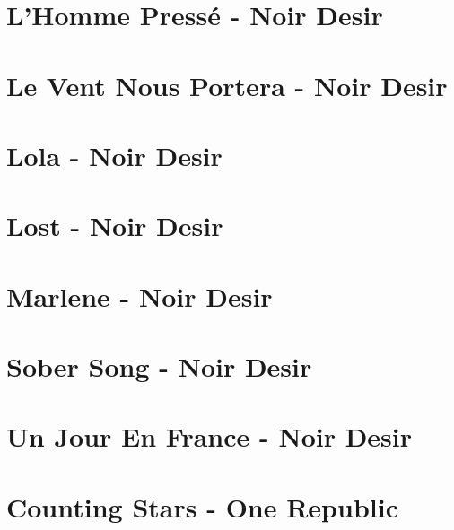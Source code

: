 \documentclass[11pt]{article}
\begin{document}
\section{L'Homme Pressé - Noir Desir}
\begin{guitar}

\end{guitar}

\section{Le Vent Nous Portera - Noir Desir}
\begin{guitar}

\end{guitar}


\section*{Lola - Noir Desir}
\begin{guitar}

\end{guitar}


\section*{Lost - Noir Desir}
\begin{guitar}

\end{guitar}

\section{Marlene - Noir Desir}
\begin{guitar}

\end{guitar}

\section{Sober Song - Noir Desir}



\section*{Un Jour En France - Noir Desir}
\begin{guitar}

\end{guitar}

\section{Counting Stars - One Republic}
\begin{guitar}

\end{guitar}
\end{document}

